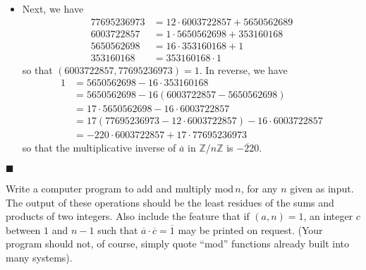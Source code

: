 \documentclass[12pt]{article}
\renewcommand{\qed}{\hfill$\blacksquare$}
\renewenvironment{proof}{\begin{addmargin}[1em]{0em}\begin{newproof}}{\end{newproof}\end{addmargin}\qed}
\newenvironment{problem}[2][Exercise]{\begin{trivlist}
\item[\hskip \labelsep {\bfseries #1}\hskip \labelsep {\bfseries #2.}]}{\end{trivlist}}
\begin{document}
\begin{proof}
\begin{itemize}
		\item Next, we have
		\begin{equation*}\begin{split}
			77695236973 & = 12 \cdot 6003722857 + 5650562689 \\
			6003722857 & = 1\cdot 5650562698 + 353160168 \\
			5650562698 & = 16 \cdot 353160168 + 1 \\
			353160168 & = 353160168 \cdot 1 
		\end{split}\end{equation*} so that $\left(6003722857,77695236973\right)=1$. In reverse, we have
		\begin{equation*}\begin{split}
			1 & = 5650562698 - 16\cdot 353160168 \\
			& = 5650562698 - 16\left(6003722857 - 5650562698\right) \\
			& = 17\cdot 5650562698 - 16\cdot 6003722857 \\
			& = 17\left(77695236973-12\cdot 6003722857\right) - 16\cdot 6003722857 \\
			& = -220\cdot 6003722857 + 17\cdot 77695236973
		\end{split}\end{equation*} so that the multiplicative inverse of $\overline{a}$ in $\mathbb{Z}/n\mathbb{Z}$ is $\overline{-220}$.
	
\end{itemize}
\end{proof}



\begin{problem}{0.3.16}
Write a computer program to add and multiply $\text{mod}\, n$, for any $n$ given as input. The output of these operations should be the least residues of the sums and products of two integers. Also include the feature that if $\left(a,n\right)=1$, an integer $c$ between $1$ and $n-1$ such that $\overline{a}\cdot \overline{c} = \overline{1}$ may be printed on request. (Your program should not, of course, simply quote ``mod'' functions already built into many systems).
\end{problem}
\end{document}
